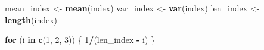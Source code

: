 \documentclass[
]{article}
\newenvironment{Shaded}{\begin{snugshade}}{\end{snugshade}}
\newcommand{\ControlFlowTok}[1]{\textcolor[rgb]{0.13,0.29,0.53}{\textbf{#1}}}
\newcommand{\DecValTok}[1]{\textcolor[rgb]{0.00,0.00,0.81}{#1}}
\newcommand{\FunctionTok}[1]{\textcolor[rgb]{0.13,0.29,0.53}{\textbf{#1}}}
\newcommand{\NormalTok}[1]{#1}
\newcommand{\OtherTok}[1]{\textcolor[rgb]{0.56,0.35,0.01}{#1}}
\newcommand{\SpecialCharTok}[1]{\textcolor[rgb]{0.81,0.36,0.00}{\textbf{#1}}}
\begin{document}
\begin{Shaded}
\begin{Highlighting}[]
\NormalTok{mean\_index }\OtherTok{\textless{}{-}} \FunctionTok{mean}\NormalTok{(index)}
\NormalTok{var\_index }\OtherTok{\textless{}{-}} \FunctionTok{var}\NormalTok{(index)}
\NormalTok{len\_index }\OtherTok{\textless{}{-}} \FunctionTok{length}\NormalTok{(index)}

\ControlFlowTok{for}\NormalTok{ (i }\ControlFlowTok{in} \FunctionTok{c}\NormalTok{(}\DecValTok{1}\NormalTok{, }\DecValTok{2}\NormalTok{, }\DecValTok{3}\NormalTok{)) \{}
  \DecValTok{1}\SpecialCharTok{/}\NormalTok{(len\_index }\SpecialCharTok{{-}}\NormalTok{ i)}
\NormalTok{\}}
\end{Highlighting}
\end{Shaded}
\end{document}
